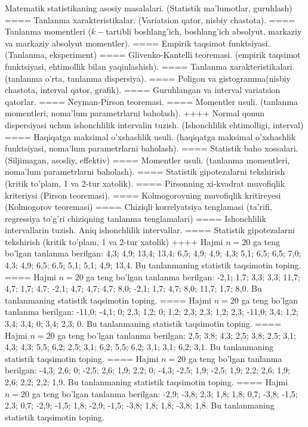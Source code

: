 Matematik statistikaning asosiy masalalari. (Statistik ma'lumotlar, guruhlash)
====
Tanlanma xarakteristikalar. (Variatsion qator, nisbiy chastota).
====
Tanlanma momentleri (\(k -\)tartibli boshlang'ich, boshlang'ich absolyut, markaziy va markaziy absolyut momentler).
====
Empirik taqsimot funktsiyasi. (Tanlanma, eksperiment)
====
Glivenko-Kantelli teoremasi. (empirik taqsimot funktsiyasi, ehtimollik bilan yaqinlashish).
====
Tanlanma xarakteristikalari.(tanlanma o'rta, tanlanma dispersiya).
====
Poligon va gistogramma(nisbiy chastota, interval qator, grafik).
====
Guruhlangan va interval variatsion qatorlar.
====
Neyman-Pirson teoremasi.
====
Momentler usuli. (tanlanma momentleri, noma'lum parametrlarni baholash).
++++
Normal qonun dispersiyasi uchun ishonchlilik intervalin tuzish. (Ishonchlilik ehtimolligi, interval)
====
Haqiqatga maksimal o'xshashlik usuli. (haqiqatga maksimal o'xshashlik funktsiyasi, noma'lum parametrlarni baholash).
====
Statistik baho xossalari. (Siljimagan, asosliy, effektiv)
====
Momentler usuli. (tanlanma momentleri, noma'lum parametrlarni baholash).
====
Statistik gipotezalarni tekshirish (kritik to'plam, 1 va 2-tur xatolik).
====
Pirsonning xi-kvadrat muvofiqlik kriteriysi (Pirson teoremasi).
====
Kolmogorovning muvofiqlik kritireyesi (Kolmogorov teoremasi)
====
Chiziqli korrelyatsiya tenglamasi (ta'rifi, regressiya to'g'ri chiziqning tanlanma tenglamalari)
====
Ishonchlilik intervallarin tuzish. Aniq ishonchlilik intervallar.
====
Statistik gipotezalarni tekshirish (kritik to'plam, 1 va 2-tur xatolik)
++++
Hajmi \(n = 20\) ga teng bo'lgan tanlanma berilgan: 4,3; 4,9; 13,4; 13,4; 6,5; 4,9; 4,9; 4,3; 5,1; 6,5; 6,5; 7,0; 4,3; 4,9; 6,5; 6,5; 5,1; 5,1; 4,9; 13,4. Bu tanlanmaning statistik taqsimotin toping.
====
Hajmi \(n = 20\) ga teng bo'lgan tanlanma berilgan: -2,1; 1,7; 3,3; 3,3; 11,7; 4,7; 1,7; 4,7; -2,1; 4,7; 4,7; 4,7; 8,0; -2,1; 1,7; 4,7; 8,0; 11,7; 1,7; 8,0. Bu tanlanmaning statistik taqsimotin toping.
====
Hajmi \(n = 20\) ga teng bo'lgan tanlanma berilgan: -11,0; -4,1; 0; 2,3; 1,2; 0; 1,2; 2,3; 2,3; 1,2; 2,3; -11,0; 3,4; 1,2; 3,4; 3,4; 0; 3,4; 2,3; 0. Bu tanlanmaning statistik taqsimotin toping.
====
Hajmi \(n = 20\) ga teng bo'lgan tanlanma berilgan: 2,5; 3,8; 4,3; 2,5; 3,8; 2,5; 3,1; 4,3; 4,3; 5,5; 6,2; 2,5; 3,1; 6,2; 5,5; 6,2; 3,1; 3,1; 6,2; 3,1. Bu tanlanmaning statistik taqsimotin toping.
====
Hajmi \(n = 20\) ga teng bo'lgan tanlanma berilgan: -4,3; 2,6; 0; -2,5; 2,6; 1,9; 2,2; 0; -4,3; -2,5; 1,9; -2,5; 1,9; 2,2; 2,6; 1,9; 2,6; 2,2; 2,2; 1,9. Bu tanlanmaning statistik taqsimotin toping.
====
Hajmi \(n = 20\) ga teng bo'lgan tanlanma berilgan: -2,9; -3,8; 2,3; 1,8; 1,8; 0,7; -3,8; -1,5; 2,3; 0,7; -2,9; -1,5; 1,8; -2,9; -1,5; -3,8; 1,8; 1,8; -3,8; 1,8. Bu tanlanmaning statistik taqsimotin toping.
